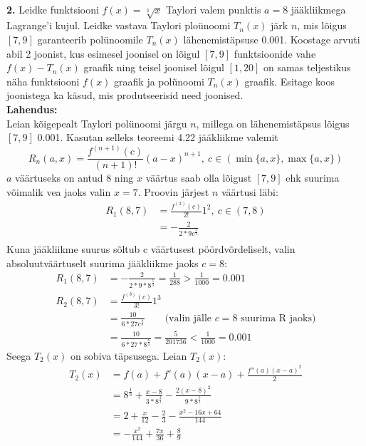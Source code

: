 \documentclass{article}
\begin{document}
\pagebreak\\
\textbf{2.} Leidke funktsiooni $f(x)=\sqrt[3]{x}$ Taylori valem punktis $a=8$ j\"a\"akliikmega Lagrange'i kujul. Leidke vastava Taylori plo\"unoomi $T_n(x)$ j\"ark $n$, mis l\~oigus $[7,9]$ garanteerib pol\"unoomile $T_n(x)$ l\"ahenemist\"apsuse 0.001. Koostage arvuti abil 2 joonist, kus esimesel joonisel on l\~oigul $[7,9]$ funktsioonide vahe $f(x)-T_n(x)$ graafik ning teisel joonisel l\~oigul $[1,20]$ on samas teljestikus n\"aha funktsiooni $f(x)$ graafik ja pol\~unoomi $T_n(x)$ graafik. Esitage koos joonistega ka k\"asud, mis produtseerisid need joonised.\\
\textbf{Lahendus:}\\
Leian k\~oigepealt Taylori pol\"unoomi j\"argu $n$, millega on l\"ahenemist\"apsus l\~oigus $[7,9]$ 0.001. Kasutan selleks teoreemi 4.22 j\"a\"akliikme valemit
\begin{equation*}
R_n(a,x)=\frac{f^{(n+1)}(c)}{(n+1)!}(a-x)^{n+1},\ c\in(\min\{a,x\},\max\{a,x\})
\end{equation*}
$a$ v\"a\"artuseks on antud 8 ning $x$ v\"a\"artus saab olla l\~oigust $[7,9]$ ehk suurima v\~oimalik vea jaoks valin $x=7$. Proovin j\"arjest $n$ v\"a\"artusi l\"abi:
\begin{equation*}
\begin{aligned}
R_1(8,7)&=\frac{f^{(2)}(c)}{2!}1^2,\ c\in(7,8)\\
&=-\frac{2}{2*9c^{\frac{5}{3}}}\\
\end{aligned}
\end{equation*}
Kuna j\"a\"akliikme suurus s\~oltub c v\"a\"artusest p\"o\"ordv\~ordeliselt, valin absoluutv\"a\"artuselt suurima j\"a\"akliikme jaoks $c=8$:
\begin{equation*}
\begin{aligned}
R_1(8,7)&=-\frac{2}{2*9*8^{\frac{5}{3}}}=\frac{1}{288}>\frac{1}{1000}=0.001\\
R_2(8,7)&=\frac{f^{(3)}(c)}{3!}1^3\\
&=\frac{10}{6*27c^{\frac{8}{3}}}\qquad\text{(valin j\"alle }c=8\text{ suurima R jaoks)}\\
&=\frac{10}{6*27*8^{\frac{8}{3}}}=\frac{5}{201736}<\frac{1}{1000}=0.001
\end{aligned}
\end{equation*}
Seega $T_2(x)$ on sobiva t\"apsusega. Leian $T_2(x)$:
\begin{equation*}
\begin{aligned}
T_2(x)&=f(a)+f'(a)(x-a)+\frac{f''(a)(x-a)^2}{2}\\
&=8^{\frac{1}{3}}+\frac{x-8}{3*8^{\frac{2}{3}}}-\frac{2(x-8)^2}{9*8^{\frac{5}{3}}}\\
&=2+\frac{x}{12}-\frac{2}{3}-\frac{x^2-16x+64}{144}\\
&=-\frac{x^2}{144}+\frac{7x}{36}+\frac{8}{9}
\end{aligned}
\end{equation*}
\end{document}
